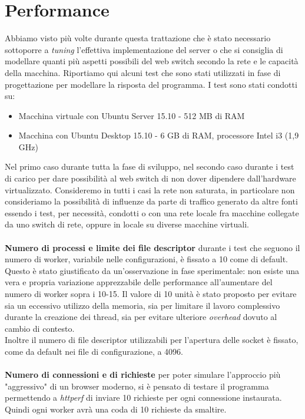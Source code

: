 \documentclass[italian]{tktltiki2}
\begin{document}
\newpage
\section{Performance}
Abbiamo visto più volte durante questa trattazione che è stato necessario sottoporre a \emph{tuning} l'effettiva implementazione del server o che si consiglia di modellare quanti più aspetti possibili del web switch secondo la rete e le capacità della macchina. Riportiamo qui alcuni test che sono stati utilizzati in fase di progettazione per modellare la risposta del programma. I test sono stati condotti su:
	\begin{itemize}
		\item Macchina virtuale con Ubuntu Server 15.10 - 512 MB di RAM 
		\item Macchina con Ubuntu Desktop 15.10 - 6 GB di RAM, processore Intel i3 (1,9 GHz) 	
	\end{itemize}
Nel primo caso durante tutta la fase di sviluppo, nel secondo caso durante i test di carico per dare possibilità al web switch di non dover dipendere dall'hardware virtualizzato. Consideremo in tutti i casi la rete non saturata, in particolare non consideriamo la possibilità di influenze da parte di traffico generato da altre fonti essendo i test, per necessità, condotti o con una rete locale fra macchine collegate da uno switch di rete, oppure in locale su diverse macchine virtuali. \\\\ 
\textbf{Numero di processi e limite dei file descriptor} durante i test che seguono il numero di worker, variabile nelle configurazioni, è fissato a 10 come di default. Questo è stato giustificato da un'osservazione in fase sperimentale: non esiste una vera e propria variazione apprezzabile delle performance all'aumentare del numero di worker sopra i 10-15. Il valore di 10 unità è stato proposto per evitare sia un eccessivo utilizzo della memoria, sia per limitare il lavoro complessivo durante la creazione dei thread, sia per evitare ulteriore \emph{overhead} dovuto al cambio di contesto. \\
Inoltre il numero di file descriptor utilizzabili per l'apertura delle socket è fissato, come da default nei file di configurazione, a 4096.\\\\
\textbf{Numero di connessioni e di richieste} per poter simulare l'approccio più "aggressivo" di un browser moderno, si è pensato di testare il programma permettendo a \emph{httperf} di inviare 10 richieste per ogni connessione instaurata. Quindi ogni worker avrà una coda di 10 richieste da smaltire.
 
\end{document}

